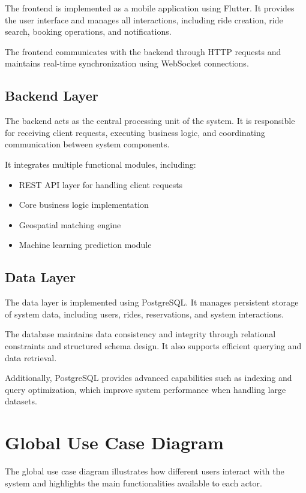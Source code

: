 The frontend is implemented as a mobile application using Flutter. It provides the user interface and manages all interactions, including ride creation, ride search, booking operations, and notifications.

The frontend communicates with the backend through HTTP requests and maintains real-time synchronization using WebSocket connections.

\subsection{Backend Layer}

The backend acts as the central processing unit of the system. It is responsible for receiving client requests, executing business logic, and coordinating communication between system components.

It integrates multiple functional modules, including:
\begin{itemize}
    \item REST API layer for handling client requests
    \item Core business logic implementation
    \item Geospatial matching engine
    \item Machine learning prediction module
\end{itemize}

\subsection{Data Layer}

The data layer is implemented using PostgreSQL. It manages persistent storage of system data, including users, rides, reservations, and system interactions.

The database maintains data consistency and integrity through relational constraints and structured schema design. It also supports efficient querying and data retrieval.

Additionally, PostgreSQL provides advanced capabilities such as indexing and query optimization, which improve system performance when handling large datasets.

\section{Global Use Case Diagram}

The global use case diagram illustrates how different users interact with the system and highlights the main functionalities available to each actor.

